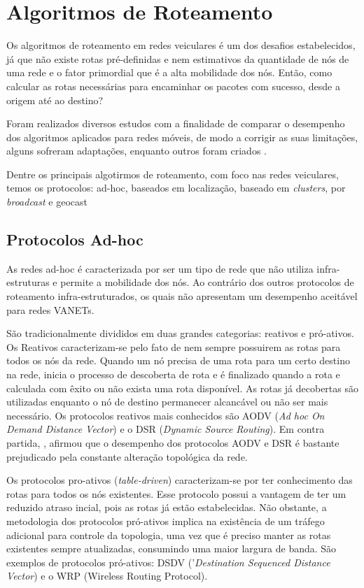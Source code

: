 \documentclass[
	12pt,				%
	oneside,			%
	a4paper,			%
	english,			%
	brazil				%
	]{abntex2ppgsi}
\begin{document}
\section{Algoritmos de Roteamento}

Os algoritmos de roteamento em redes veiculares é um dos desafios estabelecidos, já que não existe rotas pré-definidas e nem estimativos da quantidade de nós de uma rede e o fator primordial que é a alta mobilidade dos nós. Então, como calcular as rotas necessárias para encaminhar os pacotes com sucesso, desde a origem até ao destino? 

Foram realizados diversos estudos com a finalidade de comparar o desempenho dos algoritmos aplicados para redes móveis, de modo a corrigir as suas limitações, alguns sofreram adaptações, enquanto outros foram criados \cite{luis2009melhoria}.

Dentre os principais algotirmos de roteamento, com foco nas redes veiculares, temos os protocolos: ad-hoc, baseados em localização, baseado em \textit{clusters}, por \textit{broadcast} e geocast

\subsection{Protocolos Ad-hoc}

As redes ad-hoc é caracterizada por ser um tipo de rede que não utiliza infra-estruturas e permite a mobilidade dos nós. Ao contrário dos outros protocolos de roteamento infra-estruturados, os quais não apresentam um  desempenho aceitável para redes VANETs.  

São tradicionalmente divididos em duas grandes categorias: reativos e pró-ativos. Os Reativos caracterizam-se pelo fato de nem sempre possuirem as rotas para todos os nós da rede. Quando um nó precisa de uma rota para um certo destino na rede, inicia o processo de descoberta de rota e é finalizado quando a rota e calculada com êxito ou não exista uma rota disponível. As rotas já decobertas são utilizadas enquanto o nó de destino permanecer alcancável ou não ser mais necessário. Os protocolos reativos mais conhecidos são AODV (\textit{Ad hoc On Demand Distance Vector}) e o DSR (\textit{Dynamic Source Routing}). Em contra partida, , afirmou que o desempenho dos protocolos AODV e DSR é bastante prejudicado pela constante alteração topológica da rede.

Os protocolos pro-ativos (\textit{table-driven}) caracterizam-se por ter conhecimento das rotas para todos os nós existentes. Esse protocolo possui a vantagem de ter um reduzido atraso incial, pois as rotas já estão estabelecidas. Não obstante, a metodologia dos protocolos pró-ativos implica na existência de um tráfego adicional para controle da topologia, uma vez que é preciso manter as rotas existentes sempre atualizadas, consumindo uma maior largura de banda. São exemplos de protocolos pró-ativos: DSDV ('\textit{Destination Sequenced Distance Vector}) e o WRP (Wireless Routing Protocol).
\end{document}
